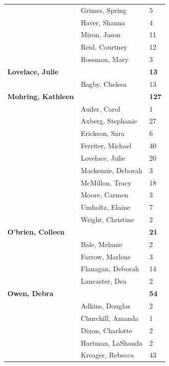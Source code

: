 \documentclass{article}\usepackage[]{graphicx}\usepackage[]{color}
\begin{document}
{\begin{longtable} { >{\raggedright}p{}|p{}p{}}
   & Grimes, Spring & 5 \\ 
   & Haver, Shanna & 4 \\ 
   \rowcolor[gray]{0.90} & Miron, Jason & 11 \\ 
   \rowcolor[gray]{0.90} & Reid, Courtney & 12 \\ 
   \rowcolor[gray]{0.90} & Rossman, Mary & 3 \\ 
  \textbf{Lovelace, Julie} &  & \hspace{2cm}\textbf{13} \\ 
   & Bagby, Chelsea & 13 \\ 
  \textbf{Mohring, Kathleen} &  & \hspace{2cm}\textbf{127} \\ 
   \rowcolor[gray]{0.90} & Auiler, Carol & 1 \\ 
   \rowcolor[gray]{0.90} & Axberg, Stephanie & 27 \\ 
   \rowcolor[gray]{0.90} & Erickson, Sara & 6 \\ 
   & Ferriter, Michael & 40 \\ 
   & Lovelace, Julie & 20 \\ 
   & Mackenzie, Deborah & 3 \\ 
   \rowcolor[gray]{0.90} & McMillon, Tracy & 18 \\ 
   \rowcolor[gray]{0.90} & Moore, Carmen & 3 \\ 
   \rowcolor[gray]{0.90} & Umholtz, Elaine & 7 \\ 
   & Wright, Christine & 2 \\ 
  \textbf{O'brien, Colleen} &  & \hspace{2cm}\textbf{21} \\ 
   & Bale, Melanie & 2 \\ 
   \rowcolor[gray]{0.90} & Farrow, Marlene & 3 \\ 
   \rowcolor[gray]{0.90} & Flanagan, Deborah & 14 \\ 
   \rowcolor[gray]{0.90} & Lancaster, Dea & 2 \\ 
  \textbf{Owen, Debra} &  & \hspace{2cm}\textbf{54} \\ 
   & Adkins, Douglas & 2 \\ 
   & Churchill, Amanda & 1 \\ 
   \rowcolor[gray]{0.90} & Dixon, Charlotte & 2 \\ 
   \rowcolor[gray]{0.90} & Hartman, LaShanda & 2 \\ 
   \rowcolor[gray]{0.90} & Kreager, Rebecca & 43 \\ 

\end{longtable}}
\end{document}
